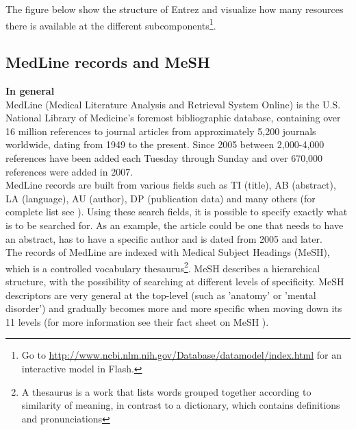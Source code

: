 The figure below show the structure of Entrez and visualize how many
resources there is available at the different
subcomponents\footnote{Go to
  \href{http://www.ncbi.nlm.nih.gov/Database/datamodel/index.html}{http://www.ncbi.nlm.nih.gov/Database/datamodel/index.html}
  for an interactive model in Flash.}.


\subsection{MedLine records and MeSH\label{MedLine_records_MeSH}}

\textbf{In general} \\
MedLine (Medical Literature Analysis and Retrieval System Online)
\cite{PubMedFactSheetMedline} is the U.S. National Library of
Medicine's foremost bibliographic database, containing over 16 million
references to journal articles from approximately 5,200 journals
worldwide, dating from 1949 to the present. Since 2005 between
2,000-4,000 references have been added each Tuesday through Sunday and
over 670,000 references were added in 2007.\\

MedLine records are built from various fields such as TI (title), AB
(abstract), LA (language), AU (author), DP (publication data) and many
others (for complete list see \cite{PubMedHelpSearchFieldDescriptionsTags}). Using these
search fields, it is possible to specify exactly what is to be
searched for. As an example, the article could be one that needs to
have an abstract, has to have a specific author and is dated from 2005
and later.\\

The records of MedLine are indexed with Medical Subject Headings
(MeSH), which is a controlled vocabulary thesaurus\footnote{A
  thesaurus is a work that lists words grouped together according to
  similarity of meaning, in contrast to a dictionary, which contains
  definitions and pronunciations}. MeSH describes a hierarchical
structure, with the possibility of searching at different levels of
specificity. MeSH descriptors are very general at the top-level (such
as 'anatomy' or 'mental disorder') and gradually becomes more and more
specific when moving down its 11 levels (for more information see
their fact sheet on MeSH \cite{FactSheetMeSH}).\\

